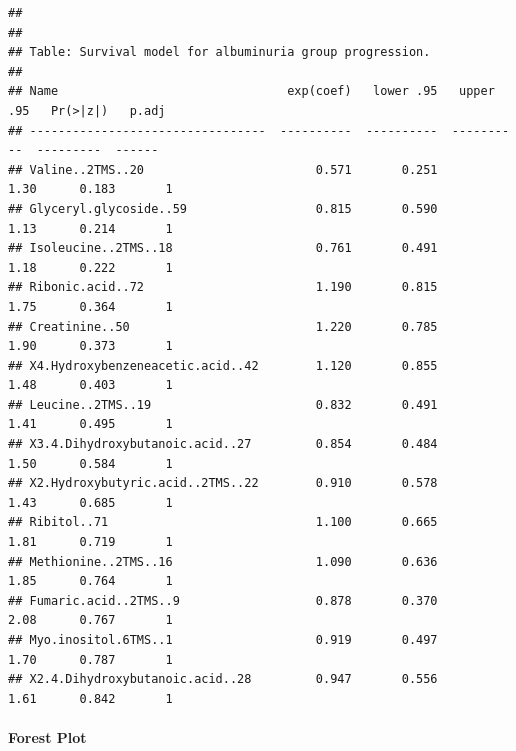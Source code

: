 \documentclass[]{article}
\let\oldparagraph\paragraph
\renewcommand{\paragraph}[1]{\oldparagraph{#1}\mbox{}}
\begin{document}
\begin{verbatim}
## 
## 
## Table: Survival model for albuminuria group progression.
## 
## Name                                exp(coef)   lower .95   upper .95   Pr(>|z|)   p.adj
## ---------------------------------  ----------  ----------  ----------  ---------  ------
## Valine..2TMS..20                        0.571       0.251        1.30      0.183       1
## Glyceryl.glycoside..59                  0.815       0.590        1.13      0.214       1
## Isoleucine..2TMS..18                    0.761       0.491        1.18      0.222       1
## Ribonic.acid..72                        1.190       0.815        1.75      0.364       1
## Creatinine..50                          1.220       0.785        1.90      0.373       1
## X4.Hydroxybenzeneacetic.acid..42        1.120       0.855        1.48      0.403       1
## Leucine..2TMS..19                       0.832       0.491        1.41      0.495       1
## X3.4.Dihydroxybutanoic.acid..27         0.854       0.484        1.50      0.584       1
## X2.Hydroxybutyric.acid..2TMS..22        0.910       0.578        1.43      0.685       1
## Ribitol..71                             1.100       0.665        1.81      0.719       1
## Methionine..2TMS..16                    1.090       0.636        1.85      0.764       1
## Fumaric.acid..2TMS..9                   0.878       0.370        2.08      0.767       1
## Myo.inositol.6TMS..1                    0.919       0.497        1.70      0.787       1
## X2.4.Dihydroxybutanoic.acid..28         0.947       0.556        1.61      0.842       1
\end{verbatim}

\newpage

\hypertarget{forest-plot}{%
\paragraph{Forest Plot}\label{forest-plot}}
\end{document}
